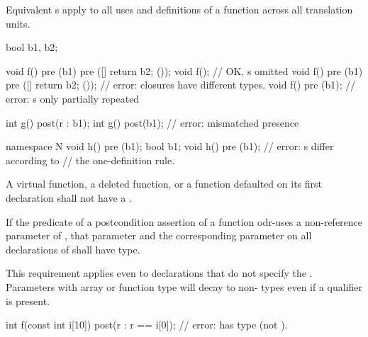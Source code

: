 \begin{note}
Equivalent
s
apply to all uses and definitions
of a function  across all translation units.
\end{note}
\begin{example}
\begin{codeblock}

bool b1, b2;

void f() pre (b1) pre ([]{ return b2; }());
void f();                       // OK, s omitted
void f() pre (b1) pre ([]{ return b2; }()); // error: closures have different types.
void f() pre (b1);              // error: s only partially repeated

int g() post(r : b1);
int g() post(b1);       // error: mismatched  presence

namespace N {
  void h() pre (b1);
  bool b1;
  void h() pre (b1);    // error: s differ according to
                        // the one-definition rule.
}
\end{codeblock}
\end{example}

\pnum
A virtual function,
a deleted function,
or a function defaulted on its first declaration
shall not have a .

\pnum
If the predicate of a postcondition assertion
of a function 
odr-uses
a non-reference parameter of ,
that parameter
and the corresponding parameter on all declarations of 
shall have  type.
\begin{note}
This requirement applies
even to declarations that do not specify the .
Parameters with array or function type
will decay to non- types
even if a  qualifier is present.
\begin{example}
\begin{codeblock}
int f(const int i[10])
  post(r : r == i[0]);  // error:  has type  (not ).
\end{codeblock}
\end{example}
\end{note}

